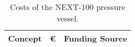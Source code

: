 \begin{table}[h!]
\begin{center}
\begin{tabular}{|l|c|c|}
\hline
 Concept & \euro & Funding Source \\
 \hline
\hline\hline
\end{tabular}  
\caption{Costs of the NEXT-100 pressure vessel.}
\label{tab:PV}
\end{center}
\end{table} 